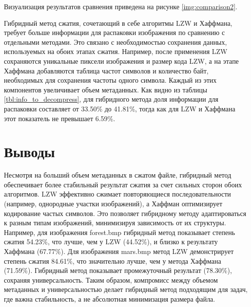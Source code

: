 \clearpage

Визуализация результатов сравнения приведена на рисунке \ref{img:comparison2}.


Гибридный метод сжатия, сочетающий в себе алгоритмы LZW и Хаффмана, требует больше информации для распаковки изображения по сравнению с отдельными методами. Это связано с необходимостью сохранения данных, используемых на обоих этапах сжатия. Например, после применения LZW сохраняются уникальные пиксели изображения и размер кода LZW, а на этапе Хаффмана добавляются таблица частот символов и количество байт, необходимых для сохранения частоты одного символа. Каждый из этих компонентов увеличивает объем метаданных. Как видно из таблицы \ref{tbl:info_to_decompress}, для гибридного метода доля информации для распаковки составляет от 33.50\% до 41.81\%, тогда как для LZW и Хаффмана этот показатель не превышает 6.59\%.

\section*{Выводы}

Несмотря на больший объем метаданных в сжатом файле, гибридный метод обеспечивает более стабильный результат сжатия за счет сильных сторон обоих алгоритмов. LZW эффективно сжимает повторяющиеся последовательности (например, однородные участки изображений), а Хаффман оптимизирует кодирование частых символов. Это позволяет гибридному методу адаптироваться к разным типам изображений, минимизируя зависимость от их структуры. Например, для изображения forest.bmp гибридный метод показывает степень сжатия 54.23\%, что лучше, чем у LZW (44.52\%), и близко к результату Хаффмана (67.77\%). Для изображения mars.bmp метод LZW демонстрирует степень сжатия 84.61\%, что значительно лучше, чем у метода Хаффмана (71.59\%). Гибридный метод показывает промежуточный результат (78.30\%), сохраняя универсальность. Таким образом, компромисс между объемом метаданных и универсальностью делает гибридный метод подходящим для задач, где важна стабильность, а не абсолютная минимизация размера файла.
